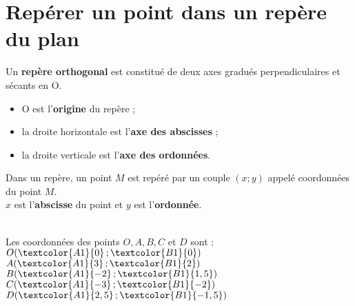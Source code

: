 \section{Repérer un point dans un repère du plan}


\begin{definition}  
   Un \textbf{repère orthogonal} est constitué de deux axes gradués perpendiculaires et sécants en O.
    \begin{itemize}
      \item O est l'\textbf{origine} du repère ;
      \item la droite horizontale est l'\textbf{axe des abscisses} ;
      \item la droite verticale est l'\textbf{axe des ordonnées}.
   \end{itemize} 
\end{definition}

\medskip

\begin{propriete}
   Dans un repère, un point $M$ est repéré par un couple $(x;y)$ appelé coordonnées du point $M$. \\
   $x$ est l'\textbf{abscisse} du point et $y$ est l'\textbf{ordonnée}.
\end{propriete}

\begin{exemple*1}
\ \\
   \correction
      Les coordonnées des points $O, A, B, C$ et $D$ sont : \\
      $O(\textcolor{A1}{0}\,;\textcolor{B1}{0})$ \qquad $A(\textcolor{A1}{3}\,;\textcolor{B1}{2})$ \qquad $B(\textcolor{A1}{-2}\,;\textcolor{B1}{1,5})$ \qquad $C(\textcolor{A1}{-3}\,;\textcolor{B1}{-2})$ \qquad $D(\textcolor{A1}{2,5}\,;\textcolor{B1}{-1,5})$
\end{exemple*1}
